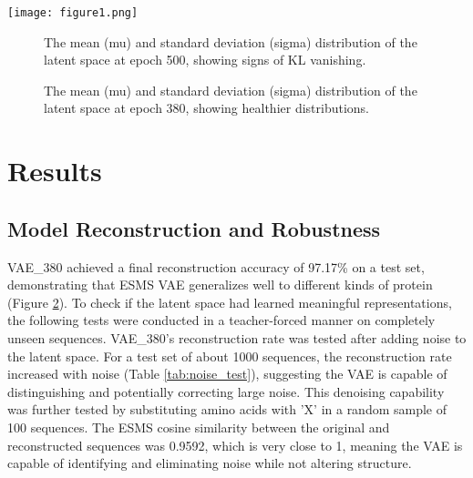 \documentclass[unnumsec,webpdf,contemporary,medium]{oup-authoring-template}
\begin{document}
\begin{figure*}[!ht]
\centering
\texttt{[image: figure1.png]}
\caption{Training and validation loss curves for Cross-Entropy (CE), Cosine Similarity (COS), Mean Squared Error (MSE), and KL Divergence (KL) over 500 epochs. The y-axis is on a log scale.}\label{fig:loss_curves}
\end{figure*}

\begin{figure}[!ht]
    \centering
    \hfill
    \caption{The mean (mu) and standard deviation (sigma) distribution of the latent space at epoch 500, showing signs of KL vanishing.}
    \label{fig:dist_500}
\end{figure}

\begin{figure}[!ht]
    \centering
    \hfill
    \caption{The mean (mu) and standard deviation (sigma) distribution of the latent space at epoch 380, showing healthier distributions.}
    \label{fig:dist_380}
\end{figure}

\section{Results}\label{sec:results}
\subsection{Model Reconstruction and Robustness}\label{subsec:reconstruction_robustness}
VAE\_380 achieved a final reconstruction accuracy of 97.17\% on a test set, demonstrating that ESMS VAE generalizes well to different kinds of protein (Figure \ref{fig:dist_380}). To check if the latent space had learned meaningful representations, the following tests were conducted in a teacher-forced manner on completely unseen sequences. VAE\_380's reconstruction rate was tested after adding noise to the latent space. For a test set of about 1000 sequences, the reconstruction rate increased with noise (Table \ref{tab:noise_test}), suggesting the VAE is capable of distinguishing and potentially correcting large noise. This denoising capability was further tested by substituting amino acids with 'X' in a random sample of 100 sequences. The ESMS cosine similarity between the original and reconstructed sequences was 0.9592, which is very close to 1, meaning the VAE is capable of identifying and eliminating noise while not altering structure.
\end{document}

